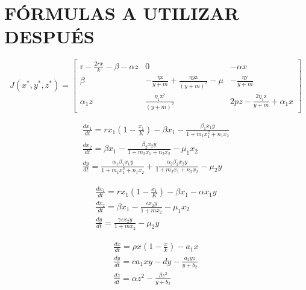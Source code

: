 \documentclass{wscpaperproc}
\theoremstyle{wsc}
\begin{document}
\section*{F\'ORMULAS A UTILIZAR DESPU\'ES} 

\begin{equation} \label{JacobianoEstability}
	J\left(x^*, y^*, z^*\right)=\left[\begin{array}{ccc}
			\mathrm{r}-\frac{2 r x}{k}-\beta-\alpha z & 0                                                                  & -\alpha x                                        \\
			\beta                                     & -\frac{\eta \mathrm{z}}{y+m}+\frac{\eta y \mathrm{z}}{(y+m)^2}-\mu & -\frac{\eta \mathrm{y}}{y+m}                     \\
			\alpha_1 z                                & \frac{\eta_1 \mathrm{z}^2}{(y+m)^2}                                & 2 p z-\frac{2 \eta_1 \mathrm{z}}{y+m}+\alpha_1 x
		\end{array}\right]
\end{equation}

\begin{equation} \label{twoPreyonePredator_Falconi}
	\begin{gathered}
		\frac{d x_1}{d t}=r x_1\left(1-\frac{x_1}{K}\right)-\beta x_1-\frac{\beta_1 x_1 y}{1+m_1 x_1^2+n_1 x_2} \\
		\frac{d x_2}{d t}=\beta x_1-\frac{\beta_2 x_2 y}{1+m_2 x_1+n_2 x_2}-\mu_1 x_2                           \\
		\frac{d y}{d t}=\frac{\alpha_1 \beta_1 x_1 y}{1+m_1 x_1^2+n_1 x_2}+\frac{\alpha_2 \beta_2 x_2 y}{1+m_2 x_1+n_2 x_2}-\mu_2 y
	\end{gathered}
\end{equation}

\begin{equation} \label{Holling1y2_Abadi}
	\begin{gathered}
		\frac{d x_1}{d t}=r x_1\left(1-\frac{x_1}{K}\right)-\beta x_1-\alpha x_1 y \\
		\frac{d x_2}{d t}=\beta x_1-\frac{\varepsilon x_2 y}{1+m x_2}-\mu_1 x_2 \\
		\frac{d y}{d t}=\frac{\gamma \varepsilon x_2 y}{1+m x_2}-\mu_2 y
	\end{gathered}
\end{equation}

\begin{equation} \label{Holling1y2_Castellanos}
	\begin{gathered}
		\frac{d x}{d t}=\rho x\left(1-\frac{x}{k}\right)-a_1 x \\
		\frac{d y}{d t}=c a_1 x y-d y-\frac{a_2 y z}{y+b_2} \\
		\frac{d z}{d t}=\alpha z^2-\frac{\beta z^2}{y+b_2}
	\end{gathered}
\end{equation}
\end{document}
